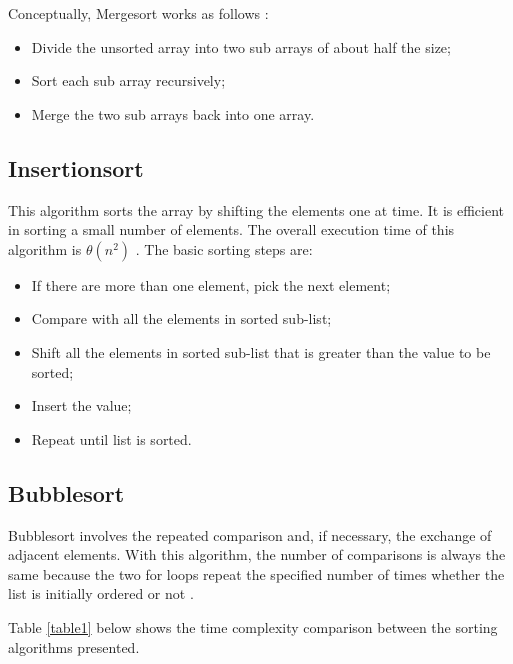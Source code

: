 Conceptually, Mergesort works as follows \cite{Abhyankar2011}:
\begin{itemize}
    \item Divide the unsorted array into two sub arrays of about half the size;
    \item Sort each sub array recursively;
    \item Merge the two sub arrays back into one array.
\end{itemize}

\subsection{Insertionsort}

This algorithm sorts the array by shifting the elements one at time. It is efficient in sorting a small number of elements. The overall execution time of this algorithm is $\theta(n^2)$ \cite{Cormen2009}. The basic sorting steps are:
\begin{itemize}
    \item If there are more than one element, pick the next element;
    \item Compare with all the elements in sorted sub-list;
    \item Shift all the elements in sorted sub-list that is greater than the value to be sorted;
    \item Insert the value;
    \item Repeat until list is sorted.
\end{itemize}

\subsection{Bubblesort}

Bubblesort involves the repeated comparison and, if necessary, the exchange of adjacent elements. With this algorithm, the number of comparisons is always the same because the two for loops repeat the specified number of times whether the list is initially ordered or not \cite{NitinArora}.

Table \ref{table1} below shows the time complexity comparison between the sorting algorithms presented.

